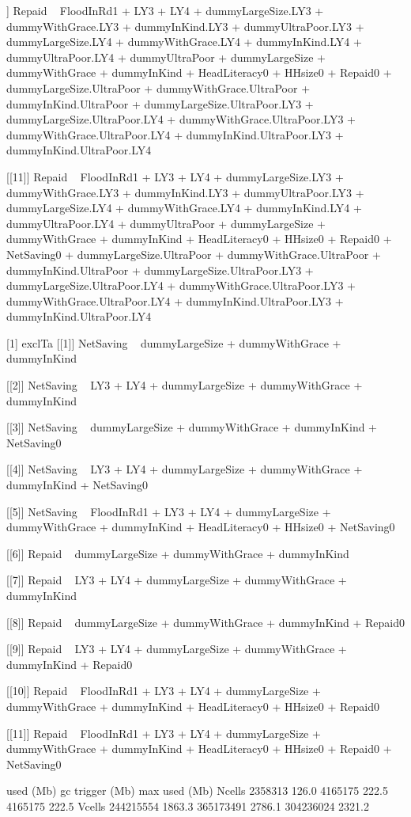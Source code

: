 \begin{Schunk}
\begin{Soutput}
[[10]]
Repaid ~ FloodInRd1 + LY3 + LY4 + dummyLargeSize.LY3 + dummyWithGrace.LY3 + 
    dummyInKind.LY3 + dummyUltraPoor.LY3 + dummyLargeSize.LY4 + 
    dummyWithGrace.LY4 + dummyInKind.LY4 + dummyUltraPoor.LY4 + 
    dummyUltraPoor + dummyLargeSize + dummyWithGrace + dummyInKind + 
    HeadLiteracy0 + HHsize0 + Repaid0 + dummyLargeSize.UltraPoor + 
    dummyWithGrace.UltraPoor + dummyInKind.UltraPoor + dummyLargeSize.UltraPoor.LY3 + 
    dummyLargeSize.UltraPoor.LY4 + dummyWithGrace.UltraPoor.LY3 + 
    dummyWithGrace.UltraPoor.LY4 + dummyInKind.UltraPoor.LY3 + 
    dummyInKind.UltraPoor.LY4

[[11]]
Repaid ~ FloodInRd1 + LY3 + LY4 + dummyLargeSize.LY3 + dummyWithGrace.LY3 + 
    dummyInKind.LY3 + dummyUltraPoor.LY3 + dummyLargeSize.LY4 + 
    dummyWithGrace.LY4 + dummyInKind.LY4 + dummyUltraPoor.LY4 + 
    dummyUltraPoor + dummyLargeSize + dummyWithGrace + dummyInKind + 
    HeadLiteracy0 + HHsize0 + Repaid0 + NetSaving0 + dummyLargeSize.UltraPoor + 
    dummyWithGrace.UltraPoor + dummyInKind.UltraPoor + dummyLargeSize.UltraPoor.LY3 + 
    dummyLargeSize.UltraPoor.LY4 + dummyWithGrace.UltraPoor.LY3 + 
    dummyWithGrace.UltraPoor.LY4 + dummyInKind.UltraPoor.LY3 + 
    dummyInKind.UltraPoor.LY4

[1] exclTa
[[1]]
NetSaving ~ dummyLargeSize + dummyWithGrace + dummyInKind

[[2]]
NetSaving ~ LY3 + LY4 + dummyLargeSize + dummyWithGrace + dummyInKind

[[3]]
NetSaving ~ dummyLargeSize + dummyWithGrace + dummyInKind + NetSaving0

[[4]]
NetSaving ~ LY3 + LY4 + dummyLargeSize + dummyWithGrace + dummyInKind + 
    NetSaving0

[[5]]
NetSaving ~ FloodInRd1 + LY3 + LY4 + dummyLargeSize + dummyWithGrace + 
    dummyInKind + HeadLiteracy0 + HHsize0 + NetSaving0

[[6]]
Repaid ~ dummyLargeSize + dummyWithGrace + dummyInKind

[[7]]
Repaid ~ LY3 + LY4 + dummyLargeSize + dummyWithGrace + dummyInKind

[[8]]
Repaid ~ dummyLargeSize + dummyWithGrace + dummyInKind + Repaid0

[[9]]
Repaid ~ LY3 + LY4 + dummyLargeSize + dummyWithGrace + dummyInKind + 
    Repaid0

[[10]]
Repaid ~ FloodInRd1 + LY3 + LY4 + dummyLargeSize + dummyWithGrace + 
    dummyInKind + HeadLiteracy0 + HHsize0 + Repaid0

[[11]]
Repaid ~ FloodInRd1 + LY3 + LY4 + dummyLargeSize + dummyWithGrace + 
    dummyInKind + HeadLiteracy0 + HHsize0 + Repaid0 + NetSaving0
\end{Soutput}
\begin{Soutput}
            used   (Mb) gc trigger   (Mb)  max used   (Mb)
Ncells   2358313  126.0    4165175  222.5   4165175  222.5
Vcells 244215554 1863.3  365173491 2786.1 304236024 2321.2
\end{Soutput}
\end{Schunk}


